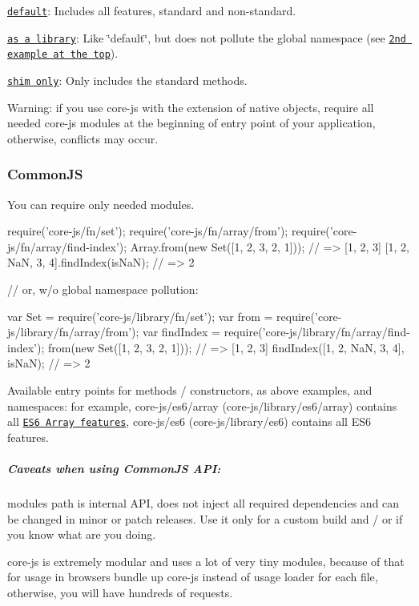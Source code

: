 \begin{DoxyItemize}
\item \href{https://raw.githack.com/zloirock/core-js/v2.6.0/client/core.min.js}{\tt default}\+: Includes all features, standard and non-\/standard.
\item \href{https://raw.githack.com/zloirock/core-js/v2.6.0/client/library.min.js}{\tt as a library}\+: Like \char`\"{}default\char`\"{}, but does not pollute the global namespace (see \href{#core-js}{\tt 2nd example at the top}).
\item \href{https://raw.githack.com/zloirock/core-js/v2.6.0/client/shim.min.js}{\tt shim only}\+: Only includes the standard methods.
\end{DoxyItemize}

Warning\+: if you use {\ttfamily core-\/js} with the extension of native objects, require all needed {\ttfamily core-\/js} modules at the beginning of entry point of your application, otherwise, conflicts may occur.

\subsubsection*{Common\+JS}

You can require only needed modules.


\begin{DoxyCode}
require('core-js/fn/set');
require('core-js/fn/array/from');
require('core-js/fn/array/find-index');
Array.from(new Set([1, 2, 3, 2, 1])); // => [1, 2, 3]
[1, 2, NaN, 3, 4].findIndex(isNaN);   // => 2

// or, w/o global namespace pollution:

var Set       = require('core-js/library/fn/set');
var from      = require('core-js/library/fn/array/from');
var findIndex = require('core-js/library/fn/array/find-index');
from(new Set([1, 2, 3, 2, 1]));      // => [1, 2, 3]
findIndex([1, 2, NaN, 3, 4], isNaN); // => 2
\end{DoxyCode}
 Available entry points for methods / constructors, as above examples, and namespaces\+: for example, {\ttfamily core-\/js/es6/array} ({\ttfamily core-\/js/library/es6/array}) contains all \href{#ecmascript-6-array}{\tt E\+S6 {\ttfamily Array} features}, {\ttfamily core-\/js/es6} ({\ttfamily core-\/js/library/es6}) contains all E\+S6 features.

\subparagraph*{Caveats when using Common\+JS A\+PI\+:}


\begin{DoxyItemize}
\item {\ttfamily modules} path is internal A\+PI, does not inject all required dependencies and can be changed in minor or patch releases. Use it only for a custom build and / or if you know what are you doing.
\item {\ttfamily core-\/js} is extremely modular and uses a lot of very tiny modules, because of that for usage in browsers bundle up {\ttfamily core-\/js} instead of usage loader for each file, otherwise, you will have hundreds of requests.
\end{DoxyItemize}

